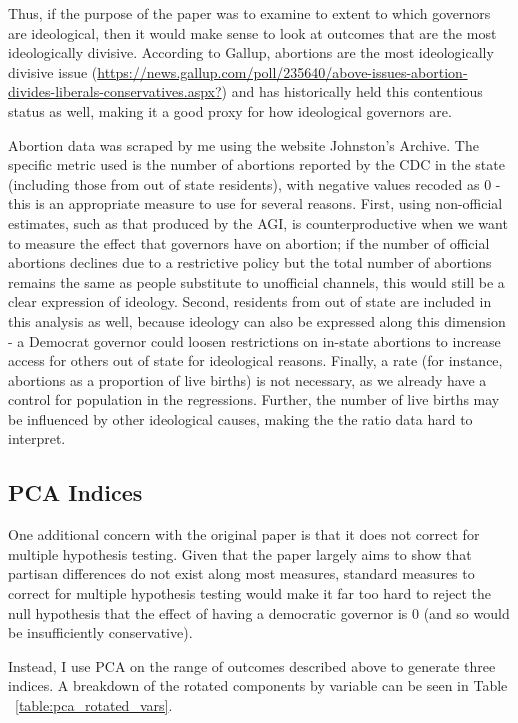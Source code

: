 \documentclass{article}
\begin{document}
Thus, if the purpose of the paper was to examine to extent to which governors are ideological, then it would make sense to look at outcomes that are the most ideologically divisive. According to Gallup, abortions are the most ideologically divisive issue (\url{https://news.gallup.com/poll/235640/above-issues-abortion-divides-liberals-conservatives.aspx?}) and has historically held this contentious status as well, making it a good proxy for how ideological governors are.

Abortion data was scraped by me using the website Johnston's Archive. The specific metric used is the number of abortions reported by the CDC in the state (including those from out of state residents), with negative values recoded as 0 - this is an appropriate measure to use for several reasons. First, using non-official estimates, such as that produced by the AGI, is counterproductive when we want to measure the effect that governors have on abortion; if the number of official abortions declines due to a restrictive policy but the total number of abortions remains the same as people substitute to unofficial channels, this would still be a clear expression of ideology. Second, residents from out of state are included in this analysis as well, because ideology can also be expressed along this dimension - a Democrat governor could loosen restrictions on in-state abortions to increase access for others out of state for ideological reasons. Finally, a rate (for instance, abortions as a proportion of live births) is not necessary, as we already have a control for population in the regressions. Further, the number of live births may be influenced by other ideological causes, making the the ratio data hard to interpret.

\subsection{PCA Indices}

One additional concern with the original paper is that it does not correct for multiple hypothesis testing. Given that the paper largely aims to show that partisan differences do not exist along most measures, standard measures to correct for multiple hypothesis testing would make it far too hard to reject the null hypothesis that the effect of having a democratic governor is 0 (and so would be insufficiently conservative). 

Instead, I use PCA on the range of outcomes described above to generate three indices. A breakdown of the rotated components by variable can be seen in Table ~\ref{table:pca_rotated_vars}.
\end{document}
